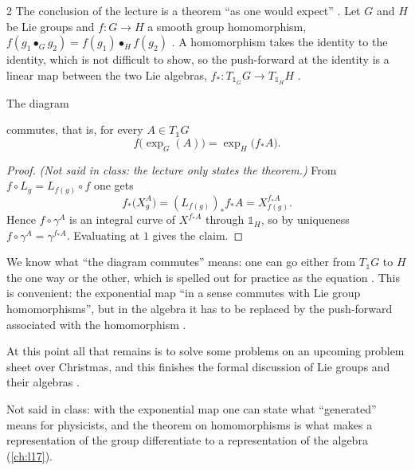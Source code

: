 \begin{paracol}{2}
The conclusion of the lecture is a theorem ``as one would expect'' . Let $G$ and $H$ be Lie groups and $f\colon G\to H$ a smooth group homomorphism, $f(g_1\bullet_Gg_2)=f(g_1)\bullet_Hf(g_2)$  . A homomorphism takes the identity to the identity, which is not difficult to show, so the push-forward at the identity is a linear map between the two Lie algebras, $f_*\colon T_{\mathbb 1_G}G\to T_{\mathbb 1_H}H$    .
\begin{theorem}\label{thm:rc-hom}
The diagram
\begin{center}
\end{center}
commutes, that is, for every $A\in T_{\mathbb 1}G$
\[
  f\bigl(\exp_G(A)\bigr)=\exp_H\bigl(f_*A\bigr).
\]
\end{theorem}
\begin{proof}
\emph{(Not said in class: the lecture only states the theorem.)} From $f\circ L_g=L_{f(g)}\circ f$ one gets
\[
  f_*\bigl(X^A_g\bigr)=(L_{f(g)})_*f_*A=X^{f_*A}_{f(g)}.
\]
Hence $f\circ\gamma^A$ is an integral curve of $X^{f_*A}$ through $\mathbb 1_H$, so by uniqueness $f\circ\gamma^A=\gamma^{f_*A}$. Evaluating at $1$ gives the claim.
 
\end{proof}
We know what ``the diagram commutes'' means: one can go either from $T_{\mathbb 1}G$ to $H$ the one way or the other, which is spelled out for practice as the equation . This is convenient: the exponential map ``in a sense commutes with Lie group homomorphisms'', but in the algebra it has to be replaced by the push-forward associated with the homomorphism .

At this point all that remains is to solve some problems on an upcoming problem sheet over Christmas, and this finishes the formal discussion of Lie groups and their algebras .
\begin{aside}
Not said in class: with the exponential map one can state what ``generated'' means for physicists, and the theorem on homomorphisms is what makes a representation of the group differentiate to a representation of the algebra (\cref{ch:l17}).
\end{aside}


\end{paracol}
